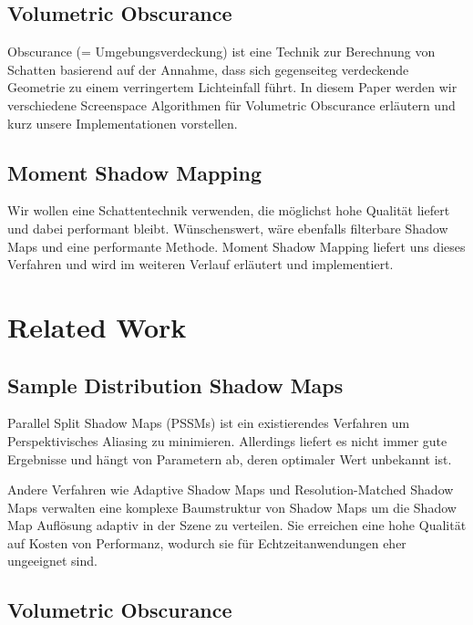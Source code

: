 \documentclass[runningheaders,a4paper]{llncs}
\begin{document}
\subsection{Volumetric Obscurance}
Obscurance (= Umgebungsverdeckung) ist eine Technik zur Berechnung von Schatten basierend auf der Annahme,
dass sich gegenseiteg verdeckende Geometrie zu einem verringertem Lichteinfall führt. In diesem Paper werden
wir verschiedene Screenspace Algorithmen für Volumetric Obscurance erläutern und kurz unsere Implementationen vorstellen.


\subsection{Moment Shadow Mapping}
Wir wollen eine Schattentechnik verwenden, die möglichst hohe Qualität liefert und dabei performant bleibt. Wünschenswert, wäre ebenfalls filterbare Shadow Maps und eine performante Methode. Moment Shadow Mapping liefert uns dieses Verfahren und wird im weiteren Verlauf erläutert und implementiert.



\section{Related Work}

\subsection{Sample Distribution Shadow Maps}

Parallel Split Shadow Maps (PSSMs) \cite{pssm} ist ein existierendes Verfahren um Perspektivisches Aliasing zu minimieren.
Allerdings liefert es nicht immer gute Ergebnisse und hängt von Parametern ab, deren optimaler Wert unbekannt ist.

Andere Verfahren wie Adaptive Shadow Maps \cite{asm} und Resolution-Matched Shadow Maps \cite{rmsm} verwalten eine komplexe Baumstruktur von Shadow Maps um die Shadow Map Auflösung adaptiv in der Szene zu verteilen.
Sie erreichen eine hohe Qualität auf Kosten von Performanz, wodurch sie für Echtzeitanwendungen eher ungeeignet sind.


\subsection{Volumetric Obscurance}
\end{document}
